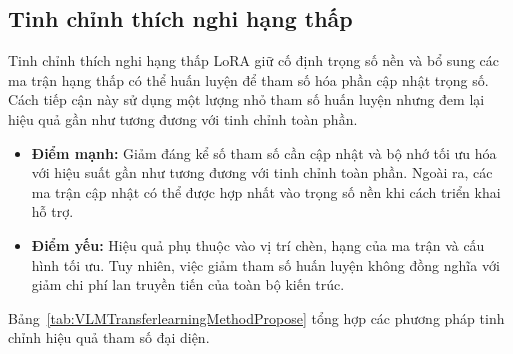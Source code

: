 \subsection{Tinh chỉnh thích nghi hạng thấp}
Tinh chỉnh thích nghi hạng thấp LoRA \cite{Hu2022LoRA} giữ cố định trọng số nền và bổ sung các ma trận hạng thấp có thể huấn luyện để tham số hóa phần cập nhật trọng số. Cách tiếp cận này sử dụng một lượng nhỏ tham số huấn luyện nhưng đem lại hiệu quả gần như tương đương với tinh chỉnh toàn phần.
\begin{itemize}
    \item \textbf{Điểm mạnh:} Giảm đáng kể số tham số cần cập nhật và bộ nhớ tối ưu hóa với hiệu suất gần như tương đương với tinh chỉnh toàn phần. Ngoài ra, các ma trận cập nhật có thể được hợp nhất vào trọng số nền khi cách triển khai hỗ trợ.
    \item \textbf{Điểm yếu:} Hiệu quả phụ thuộc vào vị trí chèn, hạng của ma trận và cấu hình tối ưu. Tuy nhiên, việc giảm tham số huấn luyện không đồng nghĩa với giảm chi phí lan truyền tiến của toàn bộ kiến trúc.
\end{itemize}

Bảng~\ref{tab:VLMTransferlearningMethodPropose} tổng hợp các phương pháp tinh chỉnh hiệu quả tham số đại diện.

